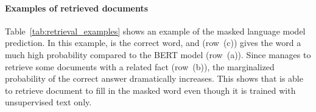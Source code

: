 

\paragraph{Examples of retrieved documents}
Table~\ref{tab:retrieval_examples} shows an example of
the \thename masked language model prediction.
In this example, 
is the correct word, and \thename (row~(c)) gives the word a much high probability
compared to the BERT model (row~(a)).
Since \thename manages to retrieve some documents with a related fact (row~(b)), the marginalized probability of the correct answer dramatically increases. This shows that \thename
is able to retrieve document to fill in the masked word even though it is trained with unsupervised text only.





